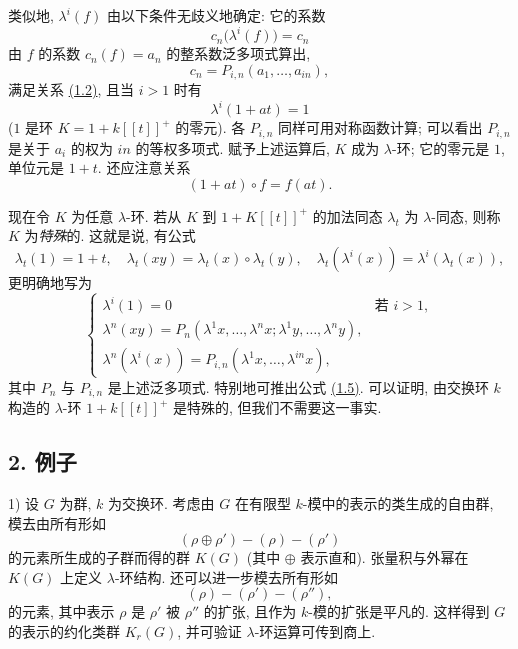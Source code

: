 类似地, $\lambda^i(f)$ 由以下条件无歧义地确定: 它的系数
\[
c_n\bigl(\lambda^i(f)\bigr)=c_n
\]
由 $f$ 的系数 $c_n(f)=a_n$ 的整系数泛多项式算出,
\begin{equation}\tag{1.8}
c_n=P_{i,n}(a_1,\ldots,a_{in}),
\end{equation}
满足关系 \hyperlink{sga6.e00.eq.1-2.occ2}{(1.2)}, 且当 $i>1$ 时有
\begin{equation}\tag{1.9}
\lambda^i(1+at)=1
\end{equation}
($1$ 是环 $K=1+k[[t]]^+$ 的零元). 各 $P_{i,n}$ 同样可用对称函数计算; 可以看出 $P_{i,n}$ 是关于 $a_i$ 的权为 $in$ 的等权多项式. 赋予上述运算后, $K$ 成为 $\lambda$-环; 它的零元是 $1$, 单位元是 $1+t$. 还应注意关系
\begin{equation}\tag{1.7 bis}
(1+at)\circ f=f(at).
\end{equation}

现在令 $K$ 为任意 $\lambda$-环. 若从 $K$ 到 $1+K[[t]]^+$ 的加法同态 $\lambda_t$ 为 $\lambda$-同态, 则称 $K$ 为\emph{特殊}的. 这就是说, 有公式
\begin{equation}\tag{1.10}
\lambda_t(1)=1+t,\quad
\lambda_t(xy)=\lambda_t(x)\circ\lambda_t(y),\quad
\lambda_t(\lambda^i(x))=\lambda^i(\lambda_t(x)),
\end{equation}
更明确地写为
\begin{equation}\tag{1.11}
\begin{cases}
\lambda^i(1)=0 & \text{若 }i>1,\\
\lambda^n(xy)=P_n(\lambda^1x,\ldots,\lambda^n x;\lambda^1y,\ldots,\lambda^n y),\\
\lambda^n(\lambda^i(x))=P_{i,n}(\lambda^1x,\ldots,\lambda^{in}x),
\end{cases}
\end{equation}
其中 $P_n$ 与 $P_{i,n}$ 是上述泛多项式. 特别地可推出公式 \hyperlink{sga6.e00.eq.1-5}{(1.5)}. 可以证明, 由交换环 $k$ 构造的 $\lambda$-环 $1+k[[t]]^+$ 是特殊的, 但我们不需要这一事实.

\subsection*{2. 例子}

1) 设 $G$ 为群, $k$ 为交换环. 考虑由 $G$ 在有限型 $k$-模中的表示的类生成的自由群, 模去由所有形如
\[
(\rho\oplus\rho')-(\rho)-(\rho')
\]
的元素所生成的子群而得的群 $K(G)$ (其中 $\oplus$ 表示直和). 张量积与外幂在 $K(G)$ 上定义 $\lambda$-环结构. 还可以进一步模去所有形如
\[
(\rho)-(\rho')-(\rho''),
\]
的元素, 其中表示 $\rho$ 是 $\rho'$ 被 $\rho''$ 的扩张, 且作为 $k$-模的扩张是平凡的. 这样得到 $G$ 的表示的约化类群 $K_r(G)$, 并可验证 $\lambda$-环运算可传到商上.

